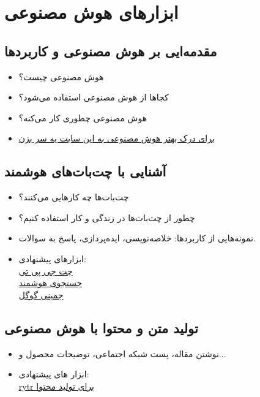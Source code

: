\chapter{ابزارهای هوش مصنوعی}
\section{مقدمه‌ایی بر هوش مصنوعی و کاربردها}
\begin{itemize}
\item
هوش مصنوعی چیست؟
\item
کجاها از هوش مصنوعی استفاده می‌شود؟
\item
هوش مصنوعی چطوری کار می‌کنه؟
\item
\href{https://teachablemachine.withgoogle.com/}{برای درک بهتر هوش مصنوعی به این سایت یه سر بزن}

\end{itemize}
\section{آشنایی با چت‌بات‌های هوشمند}
\begin{itemize}
\item
چت‌بات‌ها چه کارهایی می‌کنند؟
\item
چطور از چت‌بات‌ها در زندگی و کار استفاده کنیم؟
\item
نمونه‌هایی از کاربردها: خلاصه‌نویسی، ایده‌پردازی، پاسخ به سوالات.
\item
ابزارهای پیشنهادی:\\
\href{https://chatgpt.com/}{چت جی پی تی}\\
\href{https://www.perplexity.ai/}{جستجوی هوشمند}\\
\href{https://gemini.google.com/}{جمینی گوگل}\\
\end{itemize}
\section{تولید متن و محتوا با هوش مصنوعی}
\begin{itemize}
\item
نوشتن مقاله، پست شبکه اجتماعی، توضیحات محصول و...
\item
ابزار های پیشنهادی:\\
\href{https://app.rytr.me/}{rytr برای تولید محتوا}
\end{itemize}
